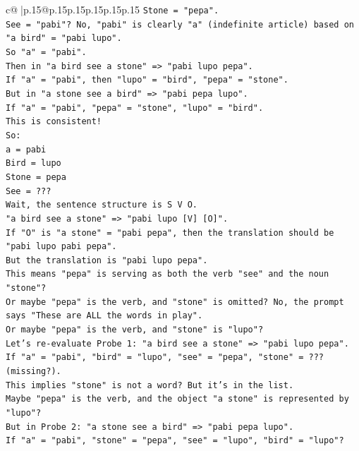 \documentclass{article}
\begin{document}
{\begin{supertabular}{c@{$\;$}|p{.15\linewidth}@{}p{.15\linewidth}p{.15\linewidth}p{.15\linewidth}p{.15\linewidth}p{.15\linewidth}}
{{{\texttt{Stone = "pepa".} \\
\texttt{See = "pabi"? No, "pabi" is clearly "a" (indefinite article) based on "a bird" = "pabi lupo".} \\
\texttt{So "a" = "pabi".} \\
\texttt{Then in "a bird see a stone" => "pabi lupo pepa".} \\
\texttt{If "a" = "pabi", then "lupo" = "bird", "pepa" = "stone".} \\
\texttt{But in "a stone see a bird" => "pabi pepa lupo".} \\
\texttt{If "a" = "pabi", "pepa" = "stone", "lupo" = "bird".} \\
\texttt{This is consistent!} \\
\texttt{So:} \\
\texttt{a = pabi} \\
\texttt{Bird = lupo} \\
\texttt{Stone = pepa} \\
\texttt{See = ???} \\
\texttt{Wait, the sentence structure is S V O.} \\
\texttt{"a bird see a stone" => "pabi lupo {[}V{]} {[}O{]}".} \\
\texttt{If "O" is "a stone" = "pabi pepa", then the translation should be "pabi lupo pabi pepa".} \\
\texttt{But the translation is "pabi lupo pepa".} \\
\texttt{This means "pepa" is serving as both the verb "see" and the noun "stone"?} \\
\texttt{Or maybe "pepa" is the verb, and "stone" is omitted? No, the prompt says "These are ALL the words in play".} \\
\texttt{Or maybe "pepa" is the verb, and "stone" is "lupo"?} \\
\texttt{Let's re{-}evaluate Probe 1: "a bird see a stone" => "pabi lupo pepa".} \\
\texttt{If "a" = "pabi", "bird" = "lupo", "see" = "pepa", "stone" = ??? (missing?).} \\
\texttt{This implies "stone" is not a word? But it's in the list.} \\
\texttt{Maybe "pepa" is the verb, and the object "a stone" is represented by "lupo"?} \\
\texttt{But in Probe 2: "a stone see a bird" => "pabi pepa lupo".} \\
\texttt{If "a" = "pabi", "stone" = "pepa", "see" = "lupo", "bird" = "lupo"?} \\
}}}
\end{supertabular}}
\end{document}
